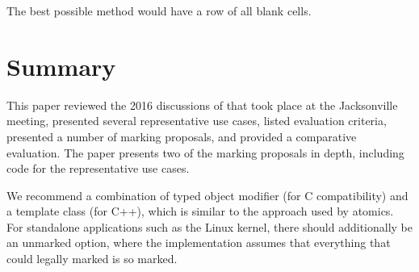 \documentclass[letterpaper,10pt]{article}
\begin{document}
The best possible method would have a row of all blank cells.

\section{Summary}
\label{sec:Summary}

This paper reviewed the 2016 discussions of 
that took place at the Jacksonville meeting, presented several representative
use cases, listed evaluation criteria, presented a number of
marking proposals, and provided a comparative
evaluation.
The paper presents two of the marking proposals in depth, including
code for the representative use cases.

We recommend a combination of typed object modifier (for C compatibility)
and a template class (for C++), which is similar to the approach used
by atomics.
For standalone applications such as the Linux kernel, there should
additionally be an
unmarked option, where the implementation assumes that everything that
could legally marked is so marked.

%
%

%







\end{document}
